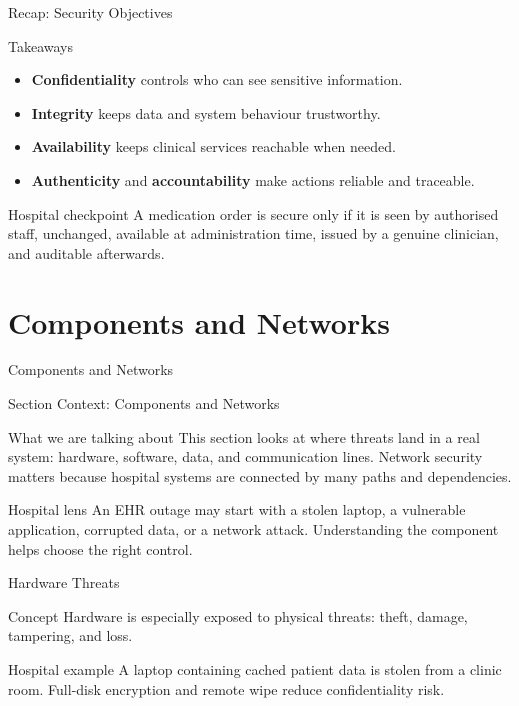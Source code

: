 \documentclass[presentation]{beamer}
\newcommand{\sectiontitleframe}[1]{
\begin{frame}[plain,c]
\begin{center}
{\usebeamerfont{title}\usebeamercolor[fg]{title}#1}
\end{center}
\end{frame}
}
\begin{document}
\begin{frame}[c]{Recap: Security Objectives}
\begin{block}{Takeaways}
\begin{itemize}
    \item \textbf{Confidentiality} controls who can see sensitive information.
    \item \textbf{Integrity} keeps data and system behaviour trustworthy.
    \item \textbf{Availability} keeps clinical services reachable when needed.
    \item \textbf{Authenticity} and \textbf{accountability} make actions reliable and traceable.
\end{itemize}
\end{block}

\begin{exampleblock}{Hospital checkpoint}
A medication order is secure only if it is seen by authorised staff, unchanged, available at
administration time, issued by a genuine clinician, and auditable afterwards.
\end{exampleblock}
\end{frame}

\section{Components and Networks}
\sectiontitleframe{Components and Networks}

\begin{frame}[c]{Section Context: Components and Networks}
\begin{block}{What we are talking about}
This section looks at where threats land in a real system: hardware, software, data, and
communication lines. Network security matters because hospital systems are connected by many
paths and dependencies.
\end{block}

\begin{exampleblock}{Hospital lens}
An EHR outage may start with a stolen laptop, a vulnerable application, corrupted data, or a
network attack. Understanding the component helps choose the right control.
\end{exampleblock}
\end{frame}

\begin{frame}[c]{Hardware Threats}
\begin{block}{Concept}
Hardware is especially exposed to physical threats: theft, damage, tampering, and loss.
\end{block}

\begin{exampleblock}{Hospital example}
A laptop containing cached patient data is stolen from a clinic room. Full-disk encryption and
remote wipe reduce confidentiality risk.
\end{exampleblock}
\end{frame}
\end{document}
